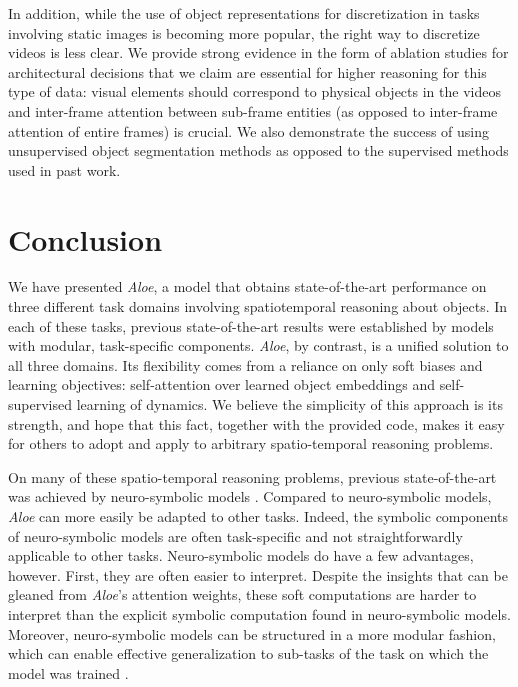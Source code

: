 \documentclass{article}
\newcommand{\Model}{\emph{Aloe}}
\begin{document}
In addition, while the use of object representations for discretization
in tasks involving static images is becoming more popular,
the right way to discretize videos is less clear.
We provide strong evidence in the form of ablation studies
for architectural decisions that we claim are essential for higher reasoning for this type of data:
visual elements should correspond to physical objects in the videos and
inter-frame attention between sub-frame entities (as opposed to inter-frame attention of entire frames) is crucial.
We also demonstrate the success of using
unsupervised object segmentation methods as opposed to the supervised methods used in past work.



\section{Conclusion}

We have presented \Model{}, a model that obtains state-of-the-art performance on three different task domains involving spatiotemporal reasoning about objects.
In each of these tasks, previous state-of-the-art results were established by models with modular, task-specific components. \Model{}, by contrast, is a unified solution to all three domains. Its flexibility comes from a reliance on only soft biases and learning objectives: self-attention over learned object embeddings and self-supervised learning of dynamics. We believe the simplicity of this approach is its strength, and hope that this fact, together with the provided code, makes it easy for others to adopt and apply to arbitrary spatio-temporal reasoning problems. 

On many of these spatio-temporal reasoning problems, previous state-of-the-art was achieved by neuro-symbolic models \citep{clevrer, acre, yi2018neural,garnelo2019reconciling,chen2021grounding}. Compared to neuro-symbolic models, \Model{} can more easily be adapted to other tasks. Indeed, the symbolic components of neuro-symbolic models are often task-specific and not straightforwardly applicable to other tasks. Neuro-symbolic models do have a few advantages, however. First, they are often easier to interpret. Despite the insights that can be gleaned from \Model{}'s attention weights, these soft computations are harder to interpret than the explicit symbolic computation found in neuro-symbolic models. Moreover, neuro-symbolic models can be structured in a more modular fashion, which can enable effective generalization to sub-tasks of the task on which the model was trained \citep{chen2021grounding}.
\end{document}
